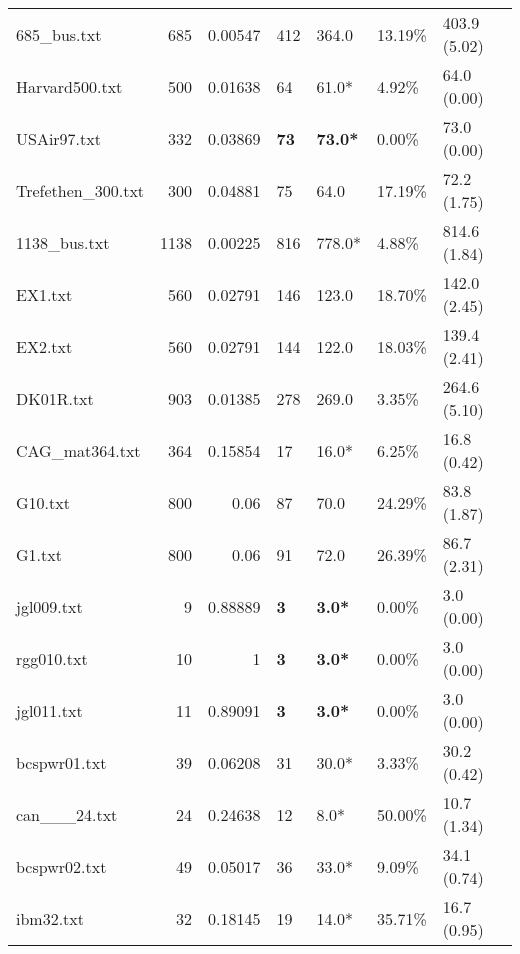 \begin{table}[h]
\begin{tabular}{lrrllll}
 685_bus.txt        &     685 &     0.00547 & 412          & 364.0           & 13.19\%  & 403.9 (5.02)   \\
 Harvard500.txt     &     500 &     0.01638 & 64           & 61.0*           & 4.92\%   & 64.0 (0.00)    \\
 USAir97.txt        &     332 &     0.03869 & \textbf{73}  & \textbf{73.0*}  & 0.00\%   & 73.0 (0.00)    \\
 Trefethen_300.txt  &     300 &     0.04881 & 75           & 64.0            & 17.19\%  & 72.2 (1.75)    \\
 1138_bus.txt       &    1138 &     0.00225 & 816          & 778.0*          & 4.88\%   & 814.6 (1.84)   \\
 EX1.txt            &     560 &     0.02791 & 146          & 123.0           & 18.70\%  & 142.0 (2.45)   \\
 EX2.txt            &     560 &     0.02791 & 144          & 122.0           & 18.03\%  & 139.4 (2.41)   \\
 DK01R.txt          &     903 &     0.01385 & 278          & 269.0           & 3.35\%   & 264.6 (5.10)   \\
 CAG_mat364.txt     &     364 &     0.15854 & 17           & 16.0*           & 6.25\%   & 16.8 (0.42)    \\
 G10.txt            &     800 &     0.06    & 87           & 70.0            & 24.29\%  & 83.8 (1.87)    \\
 G1.txt             &     800 &     0.06    & 91           & 72.0            & 26.39\%  & 86.7 (2.31)    \\
 jgl009.txt         &       9 &     0.88889 & \textbf{3}   & \textbf{3.0*}   & 0.00\%   & 3.0 (0.00)     \\
 rgg010.txt         &      10 &     1       & \textbf{3}   & \textbf{3.0*}   & 0.00\%   & 3.0 (0.00)     \\
 jgl011.txt         &      11 &     0.89091 & \textbf{3}   & \textbf{3.0*}   & 0.00\%   & 3.0 (0.00)     \\
 bcspwr01.txt       &      39 &     0.06208 & 31           & 30.0*           & 3.33\%   & 30.2 (0.42)    \\
 can___24.txt       &      24 &     0.24638 & 12           & 8.0*            & 50.00\%  & 10.7 (1.34)    \\
 bcspwr02.txt       &      49 &     0.05017 & 36           & 33.0*           & 9.09\%   & 34.1 (0.74)    \\
 ibm32.txt          &      32 &     0.18145 & 19           & 14.0*           & 35.71\%  & 16.7 (0.95)    \\

\end{tabular}
\end{table}
